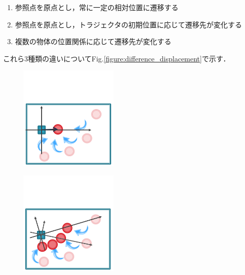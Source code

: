 	\begin{enumerate}
		\item 参照点を原点とし，常に一定の相対位置に遷移する
		\item 参照点を原点とし，トラジェクタの初期位置に応じて遷移先が変化する
		\item 複数の物体の位置関係に応じて遷移先が変化する
	\end{enumerate}
これら3種類の違いについてFig.\ref{figure:difference_displacement}で示す．
\begin{figure}[h]
	\centering
	\begin{minipage}[t]{.3\textwidth}
		\centering
		\includegraphics[width=4.7cm]{figure2_sub_a.png} \\ %
		\label{subfigure:difference_displacement1}    
	\end{minipage}
	\begin{minipage}[t]{.3\textwidth}
		\centering
		\includegraphics[width=4.7cm]{figure2_sub_b.png} \\ %
		\label{subfigure:difference_displacement2}
	\end{minipage}
	\begin{minipage}[t]{.3\textwidth}

\end{minipage}
\end{figure}
